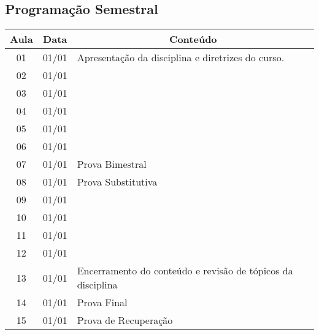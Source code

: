  
  \begin{snugshade}
  \section*{Programação Semestral} %
  \end{snugshade}
\noindent	
	\begin{tabular}{|c|c|p{12cm}|}
	  \hline
	  \textbf{Aula}& \textbf{Data}  &  \multicolumn{1}{|c|}{\textbf{Conteúdo}} \\
	  \hline
	   01 & 01/01 & Apresentação da disciplina e diretrizes do curso.\\
	  \hline
	   02 & 01/01 &           \\
	  \hline
	   03 & 01/01 &           \\
	  \hline
	   04 & 01/01 &           \\
	  \hline
	   05 & 01/01 &           \\
	  \hline
	   06 & 01/01 &           \\
	  \hline
	   07 & 01/01 & Prova Bimestral \\
	  \hline
	   08 & 01/01 & Prova Substitutiva \\
	  \hline
	   09 & 01/01 &           \\
	  \hline
	   10 & 01/01 &           \\
	  \hline
	   11 & 01/01 &           \\
	  \hline
	   12 & 01/01 &           \\
	  \hline
	   13 & 01/01 & Encerramento do conteúdo e revisão de tópicos da disciplina \\
	  \hline
	   14 & 01/01 & Prova Final \\
	  \hline
	   15 & 01/01 & Prova de Recuperação \\
      \hline
	  
	\end{tabular}
\vspace{3mm}